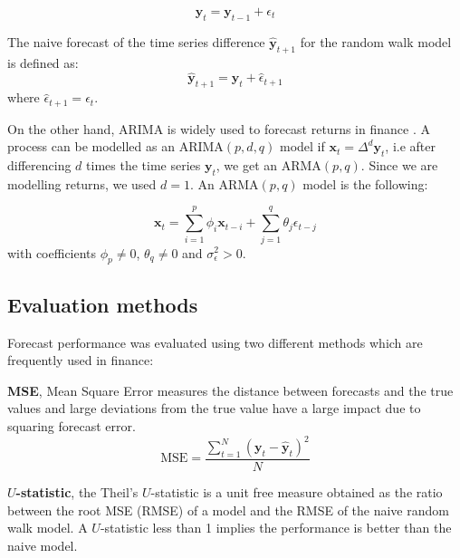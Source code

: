 \begin{equation}
\mathbf{y}_t = \mathbf{y}_{t-1} + \epsilon_{t}
\label{rwmodel}
\end{equation}

The naive forecast of the time series difference $\hat{\mathbf{y}}_{t+1}$ for the random walk model is defined as:
\begin{equation}
\hat{\mathbf{y}}_{t+1} = \mathbf{y}_t + \hat{\epsilon}_{t+1} 
\end{equation}
\noindent where  $\hat{\epsilon}_{t+1} = \epsilon_{t}$.

On the other hand, ARIMA is widely used to forecast returns in finance \cite{tsay2005}. A process can be modelled as an ARIMA$(p,d,q)$ model if $\mathbf{x}_t=\Delta^d \mathbf{y}_t $, i.e after differencing $d$ times the time series $\mathbf{y}_t$,  we get an ARMA$(p,q)$. Since we are modelling returns, we used $d=1$. An ARMA$(p,q)$ model is the following:

\begin{equation}
\mathbf{x}_t = \sum_{i=1}^p \phi_i \mathbf{x}_{t-i}  +  \sum_{j=1}^q \theta_j \epsilon_{t-j}  
\end{equation}
\noindent with coefficients $\phi_p \neq 0$, $\theta_q \neq 0$ and $\sigma_{\epsilon}^2 > 0$.



\subsection{Evaluation methods} \label{sec:evaluation}

Forecast performance was evaluated using two different methods which are frequently used in finance:
\begin{description}
\item
{\bf MSE},  Mean Square Error measures the distance between forecasts
and the true values and large deviations from the true value have a
large impact due to squaring forecast error.
\begin{equation}\label{eq:MSE}
\text{MSE} = 
\frac{\displaystyle \sum_{t=1}^{N} (\mathbf{y}_t-\hat{\mathbf{y}}_t)^2}{N}
\end{equation}
\item {\bf $U$-statistic}, the Theil's $U$-statistic \cite{theil1966} is a unit free measure obtained as the ratio between the root MSE (RMSE) of a model and the RMSE of the naive random walk model. A $U$-statistic less than 1 implies the performance is better than the naive model.
\end{description}


